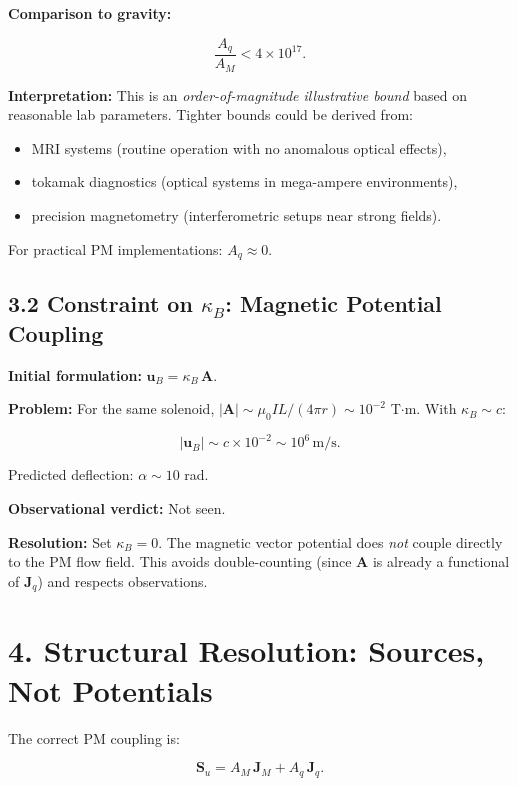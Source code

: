 \documentclass{article}
\begin{document}
\textbf{Comparison to gravity:}



\[
\frac{A_q}{A_M} < 4 \times 10^{17}.
\]



\textbf{Interpretation:} This is an \emph{order-of-magnitude illustrative
bound} based on reasonable lab parameters. Tighter bounds could be derived from:

\begin{itemize}
    \item MRI systems (routine operation with no anomalous optical effects),
    \item tokamak diagnostics (optical systems in mega-ampere environments),
    \item precision magnetometry (interferometric setups near strong fields).
\end{itemize}

For practical PM implementations: $A_q \approx 0$.

\subsection*{3.2 Constraint on $\kappa_B$: Magnetic Potential Coupling}

\textbf{Initial formulation:} $\mathbf u_B = \kappa_B\,\mathbf A$.

\textbf{Problem:} For the same solenoid, $|\mathbf A| \sim \mu_0 I L / (4\pi r)
\sim 10^{-2}$ T$\cdot$m. With $\kappa_B \sim c$:



\[
|\mathbf u_B| \sim c \times 10^{-2} \sim 10^6\,\text{m/s}.
\]



Predicted deflection: $\alpha \sim 10$ rad.

\textbf{Observational verdict:} Not seen.

\textbf{Resolution:} Set $\kappa_B = 0$. The magnetic vector potential does
\emph{not} couple directly to the PM flow field. This avoids double-counting
(since $\mathbf A$ is already a functional of $\mathbf J_q$) and respects
observations.

\section*{4. Structural Resolution: Sources, Not Potentials}

The correct PM coupling is:



\[
\mathbf S_u = A_M\,\mathbf J_M + A_q\,\mathbf J_q.
\]
\end{document}
